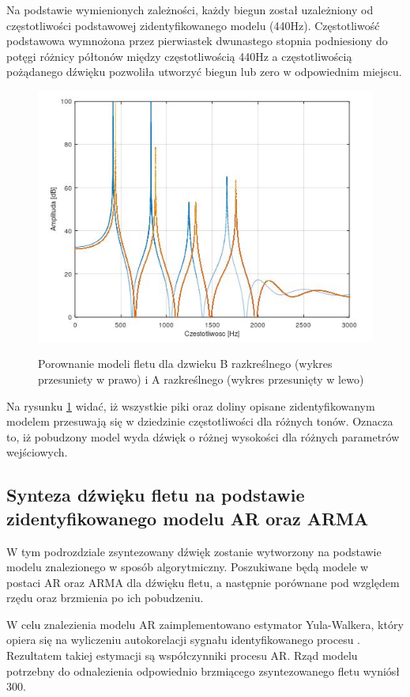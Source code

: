 Na podstawie wymienionych zależności, każdy biegun został uzależniony od częstotliwości podstawowej zidentyfikowanego modelu (440Hz). Częstotliwość podstawowa wymnożona przez pierwiastek dwunastego stopnia podniesiony do potęgi różnicy półtonów między częstotliwością 440Hz a częstotliwością pożądanego dźwięku pozwoliła utworzyć biegun lub zero w odpowiednim miejscu.
\begin{figure}[H]
	\centering
	\includegraphics[width=12cm]{grafiki/Model_B_A}
	\label{rys:por_mod_flet}
	\captionsetup{justification=centering}
	\caption{Porownanie modeli fletu dla dzwieku B razkreślnego (wykres przesuniety w prawo) i A razkreślnego (wykres przesunięty w lewo)}
	\label{rys:por_mod_flet}
\end{figure}
Na rysunku \ref{rys:por_mod_flet} widać, iż wszystkie piki oraz doliny opisane zidentyfikowanym modelem przesuwają się w dziedzinie częstotliwości dla różnych tonów. Oznacza to, iż pobudzony model wyda dźwięk o różnej wysokości dla różnych parametrów wejściowych.
\subsection{Synteza dźwięku fletu na podstawie zidentyfikowanego modelu AR oraz ARMA}
W tym podrozdziale zsyntezowany dźwięk zostanie wytworzony na podstawie modelu znalezionego w sposób algorytmiczny. Poszukiwane będą modele w postaci AR oraz ARMA dla dźwięku fletu, a następnie porównane pod względem rzędu oraz brzmienia po ich pobudzeniu.


W celu znalezienia modelu AR zaimplementowano estymator Yula-Walkera, który opiera się na wyliczeniu autokorelacji sygnału identyfikowanego procesu \cite{Y_W}. Rezultatem takiej estymacji są współczynniki procesu AR. Rząd modelu potrzebny do odnalezienia odpowiednio brzmiącego zsyntezowanego fletu wyniósł 300.



